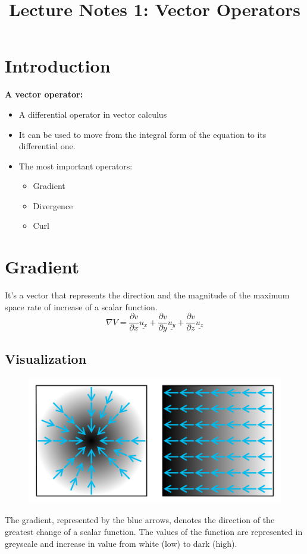 \documentclass[12 pt]{article}
\title{\huge{Lecture Notes 1: Vector Operators}}
\author{}
\date{}
\begin{document}
\maketitle
\tableofcontents
\newpage

\section{Introduction}
\textbf{A vector operator: }\begin{itemize}
    \item A differential operator in vector calculus
    \item It can be used to move from the integral form of the equation to its differential one.
    \item The most important operators:\begin{itemize}
        \item Gradient
        \item Divergence 
        \item Curl
    \end{itemize}
\end{itemize}
\section{Gradient}
It's a vector that represents the direction and the magnitude of the maximum space rate of increase of a scalar function.
$$
\nabla V=\frac{\partial{v}}{\partial{x}} \underline{u_x} +\frac{\partial{v}}{\partial{y}} \underline{u_y}+\frac{\partial{v}}{\partial{z}} \underline{u_z}
$$
\subsection{Visualization}
    \begin{figure}[H]
    \centering
    \includegraphics[scale=0.15]{./images/gradient}
    \label{gradient} 
\end{figure}
The gradient, represented by the blue arrows, denotes the direction of the greatest change of a scalar function. The values of the function are represented in greyscale and increase in value from white (low) to dark (high).
\end{document}
